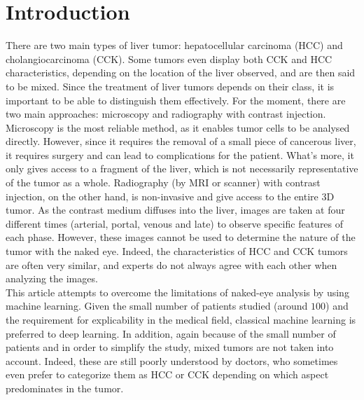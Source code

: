 \documentclass[preprint,12pt]{elsarticle}
\begin{document}


\section{Introduction}
\noindent There are two main types of liver tumor: hepatocellular carcinoma (HCC) and cholangiocarcinoma (CCK). Some tumors even display both CCK and HCC characteristics, depending on the location of the liver observed, and are then said to be mixed. Since the treatment of liver tumors depends on their class, it is important to be able to distinguish them effectively. For the moment, there are two main approaches: microscopy and radiography with contrast injection.\\
\indent Microscopy is the most reliable method, as it enables tumor cells to be analysed directly. However, since it requires the removal of a small piece of cancerous liver, it requires surgery and can lead to complications for the patient. What's more, it only gives access to a fragment of the liver, which is not necessarily representative of the tumor as a whole. Radiography (by MRI or scanner) with contrast injection, on the other hand, is non-invasive and give access to the entire 3D tumor. As the contrast medium diffuses into the liver, images are taken at four different times (arterial, portal, venous and late) to observe specific features of each phase. However, these images cannot be used to determine the nature of the tumor with the naked eye. Indeed, the characteristics of HCC and CCK tumors are often very similar, and experts do not always agree with each other when analyzing the images.\\
\indent This article attempts to overcome the limitations of naked-eye analysis by using machine learning. Given the small number of patients studied (around $100$) and the requirement for explicability in the medical field, classical machine learning is preferred to deep learning. In addition, again because of the small number of patients and in order to simplify the study, mixed tumors are not taken into account. Indeed, these are still poorly understood by doctors, who sometimes even prefer to categorize them as HCC or CCK depending on which aspect predominates in the tumor.\\
\end{document}
